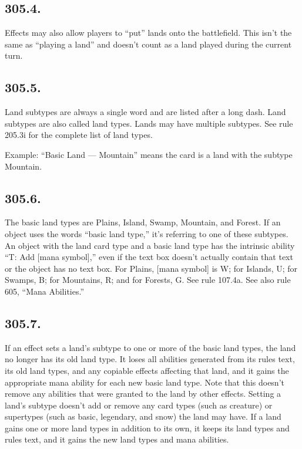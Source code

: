 \subsection*{305.4.}
Effects may also allow players to “put” lands onto the battlefield. This isn’t the same as “playing a land” and doesn’t count as a land played during the current turn.

\subsection*{305.5.}
Land subtypes are always a single word and are listed after a long dash. Land subtypes are also called land types. Lands may have multiple subtypes. See rule 205.3i for the complete list of land types.

Example: “Basic Land — Mountain” means the card is a land with the subtype Mountain.

\subsection*{305.6.}
The basic land types are Plains, Island, Swamp, Mountain, and Forest. If an object uses the words “basic land type,” it’s referring to one of these subtypes. An object with the land card type and a basic land type has the intrinsic ability “{T}: Add [mana symbol],” even if the text box doesn’t actually contain that text or the object has no text box. For Plains, [mana symbol] is {W}; for Islands, {U}; for Swamps, {B}; for Mountains, {R}; and for Forests, {G}. See rule 107.4a. See also rule 605, “Mana Abilities.”

\subsection*{305.7.}
If an effect sets a land’s subtype to one or more of the basic land types, the land no longer has its old land type. It loses all abilities generated from its rules text, its old land types, and any copiable effects affecting that land, and it gains the appropriate mana ability for each new basic land type. Note that this doesn’t remove any abilities that were granted to the land by other effects. Setting a land’s subtype doesn’t add or remove any card types (such as creature) or supertypes (such as basic, legendary, and snow) the land may have. If a land gains one or more land types in addition to its own, it keeps its land types and rules text, and it gains the new land types and mana abilities.

